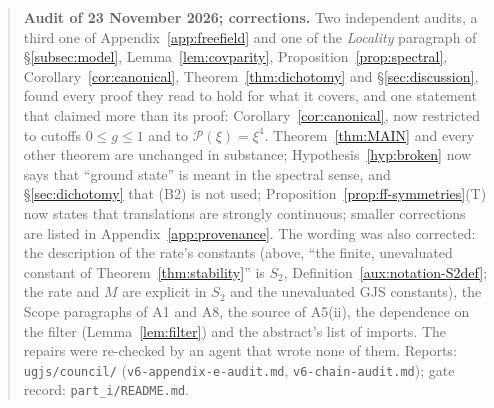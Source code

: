 \documentclass[11pt,a4paper]{article}
\theoremstyle{plain}
\theoremstyle{definition}
\theoremstyle{plain}
\theoremstyle{definition}
\begin{document}
\begin{quote}
\smallskip
\textbf{Audit of 23 November 2026; corrections.}  Two independent audits, a third one of
Appendix~\ref{app:freefield} and one of the \emph{Locality} paragraph of \S\ref{subsec:model},
Lemma~\ref{lem:covparity}, Proposition~\ref{prop:spectral}, Corollary~\ref{cor:canonical},
Theorem~\ref{thm:dichotomy} and \S\ref{sec:discussion}, found every proof they read to hold for
what it covers, and one statement that claimed more than its proof:
Corollary~\ref{cor:canonical}, now restricted to cutoffs $0\le g\le1$ and to
$\mathscr P(\xi)=\xi^4$.  Theorem~\ref{thm:MAIN} and every other theorem are unchanged in
substance; Hypothesis~\ref{hyp:broken} now says that ``ground state'' is meant in the spectral
sense, and \S\ref{sec:dichotomy} that (B2) is not used; Proposition~\ref{prop:ff-symmetries}(T)
now states that translations are strongly continuous; smaller corrections are listed in
Appendix~\ref{app:provenance}.  The wording was also corrected: the description of the rate's
constants (above, ``the finite, unevaluated constant of Theorem~\ref{thm:stability}'' is $S_2$,
Definition~\ref{aux:notation-S2def}; the rate and $M$ are explicit in $S_2$ and the unevaluated
GJS constants), the Scope paragraphs of A1 and A8, the source of A5(ii), the dependence on the
filter (Lemma~\ref{lem:filter}) and the abstract's list of imports.  The repairs were re-checked
by an agent that wrote none of them.  Reports: \texttt{ugjs/council/}
(\texttt{v6-appendix-e-audit.md}, \texttt{v6-chain-audit.md}); gate record:
\texttt{part\_i/README.md}.
\end{quote}
\end{document}
